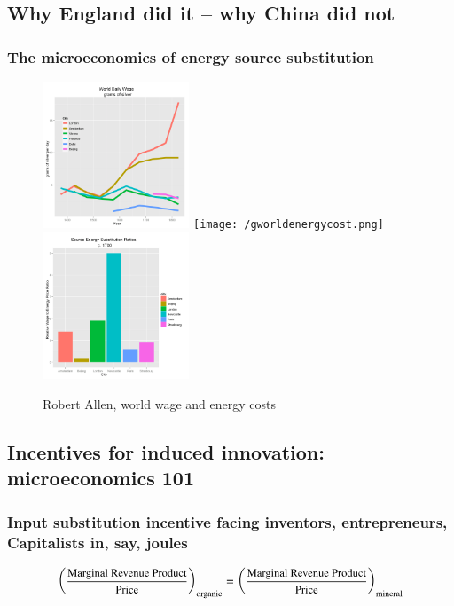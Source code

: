\documentclass[final]{beamer}
\begin{document}
\subsection{Why England did it -- why China did not}

\begin{frame}
\frametitle{The microeconomics of energy source substitution} 	
 		\begin{figure}
		\centerline{
		\mbox{\includegraphics[width=0.39\textwidth]{gworldwages.png}}
		\mbox{\texttt{[image: /gworldenergycost.png]}}
		\mbox{\includegraphics[width=0.39\textwidth]{wage-energy.png}}
		}
		\caption{Robert Allen, world wage and energy costs}
		\end{figure}
\end{frame}	

\subsection{Incentives for induced innovation: microeconomics 101}
\begin{frame}
\frametitle{Input substitution incentive facing inventors, entrepreneurs, Capitalists in, say, joules}
		\begin{equation*}
		\left(\frac{\small{\text{Marginal Revenue Product}}}{\small{\text{Price}}}\right)_{\tiny{\text{organic}}} =\left( \frac{\small{\text{Marginal Revenue Product}}}{\small{\text{Price}}}\right)_{\tiny{\text{mineral}}}
		\end{equation*}	
\end{frame}
\end{document}
